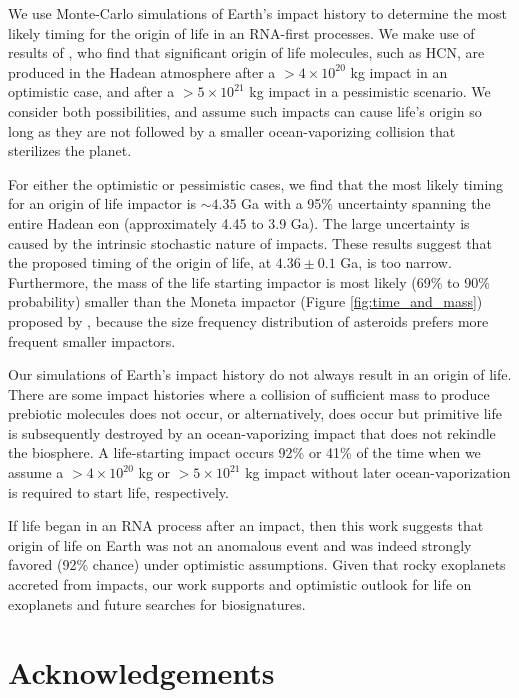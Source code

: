\documentclass[preprint]{aastex63}
\begin{document}
We use Monte-Carlo simulations of Earth's impact history to determine the most likely timing for the origin of life in an RNA-first processes. We make use of results of \citep{Wogan_2023}, who find that significant origin of life molecules, such as HCN, are produced in the Hadean atmosphere after a $> 4 \times 10^{20}$ kg impact in an optimistic case, and after a $> 5 \times 10^{21}$ kg impact in a pessimistic scenario. We consider both possibilities, and assume such impacts can cause life's origin so long as they are not followed by a smaller ocean-vaporizing collision that sterilizes the planet.

For either the optimistic or pessimistic cases, we find that the most likely timing for an origin of life impactor is $\sim 4.35$ Ga with a 95\% uncertainty spanning the entire Hadean eon (approximately 4.45 to 3.9 Ga). The large uncertainty is caused by the intrinsic stochastic nature of impacts. These results suggest that the \citet{Benner_2020} proposed timing of the origin of life, at $4.36 \pm 0.1$ Ga, is too narrow. Furthermore, the mass of the life starting impactor is most likely (69\% to 90\% probability) smaller than the Moneta impactor (Figure \ref{fig:time_and_mass}) proposed by \citet{Benner_2020}, because the size frequency distribution of asteroids prefers more frequent smaller impactors.


Our simulations of Earth's impact history do not always result in an origin of life. There are some impact histories where a collision of sufficient mass to produce prebiotic molecules does not occur, or alternatively, does occur but primitive life is subsequently destroyed by an ocean-vaporizing impact that does not rekindle the biosphere. A life-starting impact occurs 92\% or 41\% of the time when we assume a $> 4 \times 10^{20}$ kg or $> 5 \times 10^{21}$ kg impact without later ocean-vaporization is required to start life, respectively. 

If life began in an RNA process after an impact, then this work suggests that origin of life on Earth was not an anomalous event and was indeed strongly favored (92\% chance) under optimistic assumptions. Given that rocky exoplanets accreted from impacts, our work supports and optimistic outlook for life on exoplanets and future searches for biosignatures. 

\section*{Acknowledgements}
\end{document}
